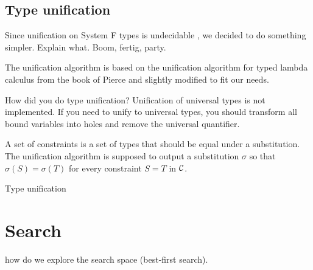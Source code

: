 \subsection{Type unification}

Since unification on System F types is undecidable \cite{Huet1975}, we decided to do something simpler. Explain what. Boom, fertig, party.

The unification algorithm is based on the unification algorithm for typed lambda calculus from the book of Pierce  and slightly modified to fit our needs.
  
How did you do type unification?
Unification of universal types is not implemented. If you need to unify to universal types, you should transform all bound variables into holes and remove the universal quantifier.

A set of constraints is a set of types that should be equal under a substitution. The unification algorithm is supposed to output a substitution $\sigma$ so that $\sigma(S) = \sigma(T)$ for every constraint $S = T$ in $\mathcal{C}$.

\begin{algorithm}
\caption{Type unification}

\end{algorithm} 

\section{Search}
how do we explore the search space (best-first search).
